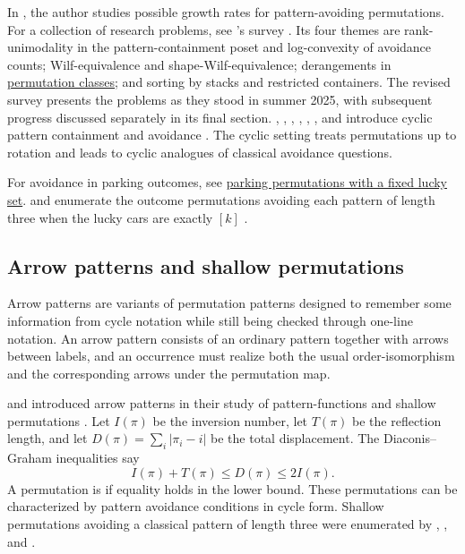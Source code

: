 In \cite{Vatter2019}, the author studies possible growth rates for pattern-avoiding permutations.
For a collection of research problems, see
's survey \cite{Vatter2026x}. Its four themes are
rank-unimodality in the pattern-containment poset and log-convexity of
avoidance counts; Wilf-equivalence and shape-Wilf-equivalence; derangements
in \hyperref[patternAvoidanceClasses]{permutation classes}; and sorting by
stacks and restricted containers. The revised survey presents the problems
as they stood in summer 2025, with subsequent progress discussed separately
in its final section.
, , ,
, , , and
 introduce cyclic pattern containment and avoidance
\cite{DomagalskiElizaldeLiangMinnichSaganSchmidtSietsema2022}.  The cyclic
setting treats permutations up to rotation and leads to cyclic analogues of
classical avoidance questions.


For avoidance in parking outcomes, see
\hyperref[parkingPermutationLuckyPatterns]{parking permutations with a fixed lucky set}.
 and  enumerate the outcome
permutations avoiding each pattern of length three when the lucky cars
are exactly $[k]$ \cite{FerreriMartinez2026x}.

\subsection[arrowPatterns]{Arrow patterns and shallow permutations}

Arrow patterns are variants of permutation patterns designed to remember some
information from cycle notation while still being checked through one-line
notation.  An arrow pattern consists of an ordinary pattern together with
arrows between labels, and an occurrence must realize both the usual
order-isomorphism and the corresponding arrows under the permutation map.

 and  introduced arrow
patterns in their study of pattern-functions and shallow permutations
\cite{BermanTenner2022}.  Let $I(\pi)$ be the inversion number, let
$T(\pi)$ be the reflection length, and let
$D(\pi)=\sum_i |\pi_i-i|$ be the total displacement.  The
Diaconis--Graham inequalities say
\[
  I(\pi)+T(\pi) \leq D(\pi) \leq 2I(\pi).
\]
A permutation is  if equality holds in the lower bound.
These permutations can be characterized by pattern avoidance conditions in
cycle form.  Shallow permutations avoiding a classical pattern of length
three were enumerated by , , and
 \cite{ArcherGearyLaudone2026}.

